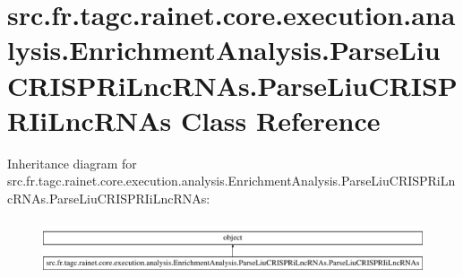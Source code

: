 \hypertarget{classsrc_1_1fr_1_1tagc_1_1rainet_1_1core_1_1execution_1_1analysis_1_1EnrichmentAnalysis_1_1Parsee13b9e804847e1d3b2331cd039942e35}{\section{src.\-fr.\-tagc.\-rainet.\-core.\-execution.\-analysis.\-Enrichment\-Analysis.\-Parse\-Liu\-C\-R\-I\-S\-P\-Ri\-Lnc\-R\-N\-As.\-Parse\-Liu\-C\-R\-I\-S\-P\-R\-Ii\-Lnc\-R\-N\-As Class Reference}
\label{classsrc_1_1fr_1_1tagc_1_1rainet_1_1core_1_1execution_1_1analysis_1_1EnrichmentAnalysis_1_1Parsee13b9e804847e1d3b2331cd039942e35}
}
Inheritance diagram for src.\-fr.\-tagc.\-rainet.\-core.\-execution.\-analysis.\-Enrichment\-Analysis.\-Parse\-Liu\-C\-R\-I\-S\-P\-Ri\-Lnc\-R\-N\-As.\-Parse\-Liu\-C\-R\-I\-S\-P\-R\-Ii\-Lnc\-R\-N\-As\-:\begin{figure}[H]
\begin{center}
\leavevmode
\includegraphics[height=1.649485cm]{classsrc_1_1fr_1_1tagc_1_1rainet_1_1core_1_1execution_1_1analysis_1_1EnrichmentAnalysis_1_1Parsee13b9e804847e1d3b2331cd039942e35}
\end{center}
\end{figure}

